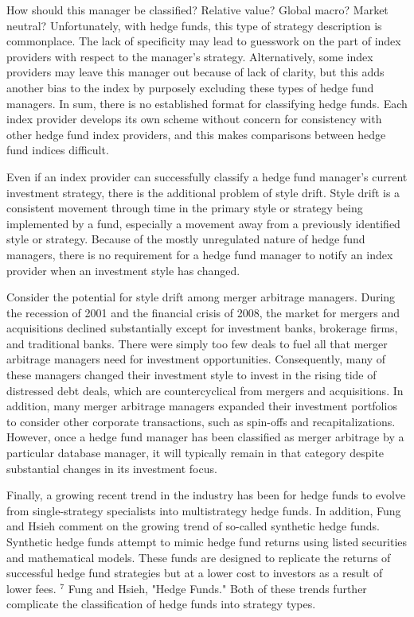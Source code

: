 \documentclass[11pt]{article}
\begin{document}
How should this manager be classified? Relative value? Global macro? Market neutral? Unfortunately, with hedge funds, this type of strategy description is commonplace. The lack of specificity may lead to guesswork on the part of index providers with respect to the manager's strategy. Alternatively, some index providers may leave this manager out because of lack of clarity, but this adds another bias to the index by purposely excluding these types of hedge fund managers. In sum, there is no established format for classifying hedge funds. Each index provider develops its own scheme without concern for consistency with other hedge fund index providers, and this makes comparisons between hedge fund indices difficult.

Even if an index provider can successfully classify a hedge fund manager's current investment strategy, there is the additional problem of style drift. Style drift is a consistent movement through time in the primary style or strategy being implemented by a fund, especially a movement away from a previously identified style or strategy. Because of the mostly unregulated nature of hedge fund managers, there is no requirement for a hedge fund manager to notify an index provider when an investment style has changed.

Consider the potential for style drift among merger arbitrage managers. During the recession of 2001 and the financial crisis of 2008, the market for mergers and acquisitions declined substantially except for investment banks, brokerage firms, and traditional banks. There were simply too few deals to fuel all that merger arbitrage managers need for investment opportunities. Consequently, many of these managers changed their investment style to invest in the rising tide of distressed debt deals, which are countercyclical from mergers and acquisitions. In addition, many merger arbitrage managers expanded their investment portfolios to consider other corporate transactions, such as spin-offs and recapitalizations. However, once a hedge fund manager has been classified as merger arbitrage by a particular database manager, it will typically remain in that category despite substantial changes in its investment focus.

Finally, a growing recent trend in the industry has been for hedge funds to evolve from single-strategy specialists into multistrategy hedge funds. In addition, Fung and Hsieh comment on the growing trend of so-called synthetic hedge funds. Synthetic hedge funds attempt to mimic hedge fund returns using listed securities and mathematical models. These funds are designed to replicate the returns of successful hedge fund strategies but at a lower cost to investors as a result of lower fees. ${ }^{7}$ Fung and Hsieh, "Hedge Funds." Both of these trends further complicate the classification of hedge funds into strategy types.
\end{document}
